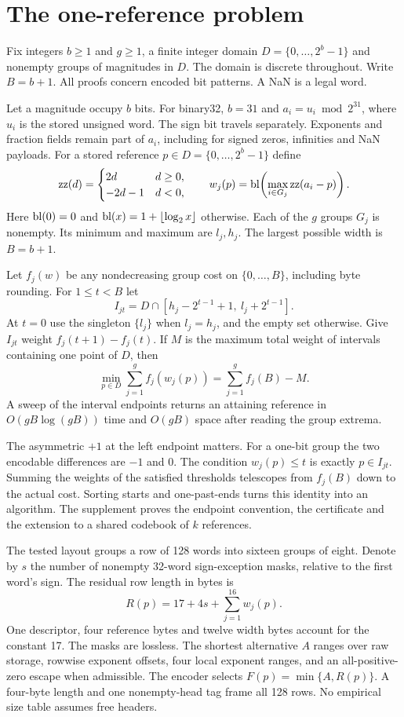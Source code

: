 \section{The one-reference problem}\label{app:one}
Fix integers $b\ge1$ and $g\ge1$, a finite integer domain $D=\{0,\ldots,2^b-1\}$ and nonempty groups of magnitudes in $D$. The domain is discrete throughout. Write $B=b+1$. All proofs concern encoded bit patterns. A NaN is a legal word.

Let a magnitude occupy $b$ bits. For binary32, $b=31$ and $a_i=u_i\bmod 2^{31}$, where $u_i$ is the stored unsigned word. The sign bit travels separately. Exponents and fraction fields remain part of $a_i$, including for signed zeros, infinities and NaN payloads. For a stored reference $p\in D=\{0,\ldots,2^b-1\}$ define
\[
 \operatorname{zz}(d)=\begin{cases}2d&d\ge0,\\-2d-1&d<0,\end{cases}
 \qquad w_j(p)=\operatorname{bl}\!\left(\max_{i\in G_j}\operatorname{zz}(a_i-p)\right).
\]
Here $\operatorname{bl}(0)=0$ and $\operatorname{bl}(x)=1+\lfloor\log_2 x\rfloor$ otherwise. Each of the $g$ groups $G_j$ is nonempty. Its minimum and maximum are $l_j,h_j$. The largest possible width is $B=b+1$.

\begin{theorem}\label{th:sweep}
Let $f_j(w)$ be any nondecreasing group cost on $\{0,\dots,B\}$, including byte rounding. For $1\le t<B$ let
\[
 I_{jt}=D\cap[h_j-2^{t-1}+1,\ l_j+2^{t-1}].
\]
At $t=0$ use the singleton $\{l_j\}$ when $l_j=h_j$, and the empty set otherwise. Give $I_{jt}$ weight $f_j(t+1)-f_j(t)$. If $M$ is the maximum total weight of intervals containing one point of $D$, then
\[
 \min_{p\in D}\sum_{j=1}^{g} f_j(w_j(p))=\sum_{j=1}^{g} f_j(B)-M.
\]
A sweep of the interval endpoints returns an attaining reference in $O(gB\log(gB))$ time and $O(gB)$ space after reading the group extrema.
\end{theorem}

The asymmetric $+1$ at the left endpoint matters. For a one-bit group the two encodable differences are $-1$ and $0$. The condition $w_j(p)\le t$ is exactly $p\in I_{jt}$. Summing the weights of the satisfied thresholds telescopes from $f_j(B)$ down to the actual cost. Sorting starts and one-past-ends turns this identity into an algorithm. The supplement proves the endpoint convention, the certificate and the extension to a shared codebook of $k$ references.


The tested layout groups a row of 128 words into sixteen groups of eight. Denote by $s$ the number of nonempty 32-word sign-exception masks, relative to the first word's sign. The residual row length in bytes is
\[
 R(p)=17+4s+\sum_{j=1}^{16} w_j(p).
\]
One descriptor, four reference bytes and twelve width bytes account for the constant 17. The masks are lossless. The shortest alternative $A$ ranges over raw storage, rowwise exponent offsets, four local exponent ranges, and an all-positive-zero escape when admissible. The encoder selects $F(p)=\min\{A,R(p)\}$. A four-byte length and one nonempty-head tag frame all 128 rows. No empirical size table assumes free headers.

